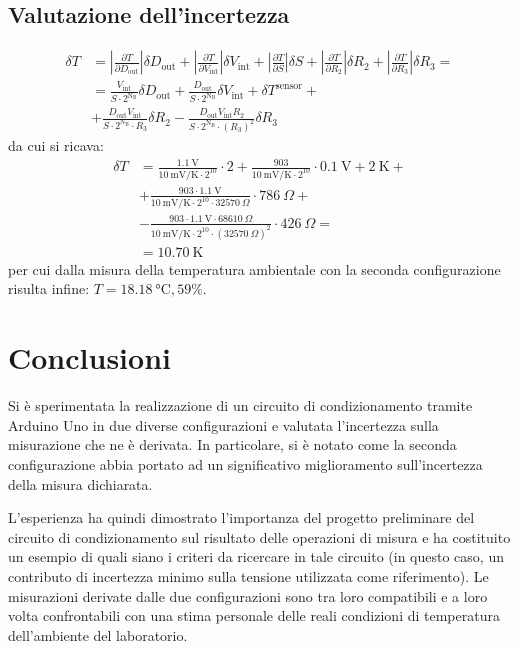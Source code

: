 \documentclass{article}
\begin{document}
\subsection{Valutazione dell'incertezza}
\begin{equation*}
    \begin{split}    
        \delta T&=\left|\frac{\partial T}{\partial D_{\text{out}}}\right|\delta D_{\text{out}}+\left|\frac{\partial T}{\partial V_{\text{int}}}\right|\delta V_{\text{int}}+\left|\frac{\partial T}{\partial S}\right|\delta S+\left|\frac{\partial T}{\partial R_2}\right|\delta R_2+\left|\frac{\partial T}{\partial R_3}\right|\delta R_3 =\\
        &=\frac{V_{\text{int}}}{S\cdot2^{\text{N}_\text{B}}}\delta D_{\text{out}}+\frac{D_{\text{out}}}{S\cdot2^{\text{N}_\text{B}}}\delta V_{\text{int}}+\delta T^{\text{sensor}}+\\
        &+\frac{D_{\text{out}}V_{\text{int}}}{S\cdot2^{\text{N}_\text{B}}\cdot R_3}\delta R_2-\frac{D_{\text{out}}V_{\text{int}}R_2}{S\cdot2^{\text{N}_\text{B}}\cdot {\left(R_3\right)}^2}\delta R_3
    \end{split}    
\end{equation*}
da cui si ricava:
\begin{equation*}
    \begin{split}
        \delta T&=\frac{\SI{1.1}\volt}{\SI{10}{\milli\volt\per\kelvin}\cdot2^{10}}\cdot 2+\frac{903}{\SI{10}{\milli\volt\per\kelvin}\cdot 2^{10}}\cdot\SI{0.1}{\volt}+\SI{2}{\kelvin}+\\
        &+\frac{903\cdot\SI{1.1}{\volt}}{\SI{10}{\milli\volt\per\kelvin}\cdot 2^{10}\cdot \SI{32570}{\Omega}}\cdot\SI{786}{\Omega}+\\
        &- \frac{903\cdot\SI{1.1}{\volt}\cdot\SI{68610}{\Omega}}{\SI{10}{\milli\volt\per\kelvin}\cdot 2^{10}\cdot{\left(\SI{32570}{\Omega}\right)}^2}\cdot\SI{426}{\Omega}=\\
        &=\SI{10.70}{\kelvin}
    \end{split}
\end{equation*}
per cui dalla misura della temperatura ambientale con la seconda configurazione risulta infine: $T = \SI{18.18}{\celsius}, 59\%$.
\section{Conclusioni}
Si è sperimentata la realizzazione di un circuito di condizionamento tramite Arduino Uno in due diverse configurazioni e valutata l'incertezza sulla misurazione che ne è derivata. In particolare, si è notato come la seconda configurazione abbia portato ad un significativo miglioramento sull'incertezza della misura dichiarata. 

L'esperienza ha quindi dimostrato l'importanza del progetto preliminare del circuito di condizionamento sul risultato delle operazioni di misura
e ha costituito un esempio di quali siano i criteri da ricercare in tale circuito (in questo caso, un contributo di incertezza minimo sulla tensione utilizzata come riferimento).
Le misurazioni derivate dalle due configurazioni sono tra loro compatibili e a loro volta confrontabili con una stima personale delle reali condizioni di temperatura dell'ambiente del laboratorio. 
\end{document}
